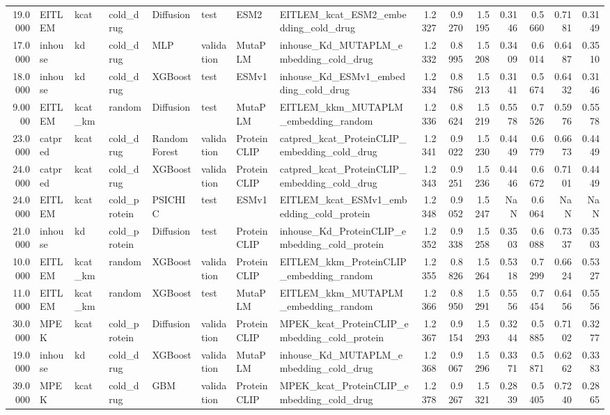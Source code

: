 \begin{tabular}{rlllllllrrrrrrr}
19.0000 & EITLEM & kcat & cold_drug & Diffusion & test & ESM2 & EITLEM_kcat_ESM2_embedding_cold_drug & 1.2327 & 0.9270 & 1.5195 & 0.3146 & 0.5660 & 0.7181 & 0.3149 \\
17.0000 & inhouse & kd & cold_drug & MLP & validation & MutaPLM & inhouse_Kd_MUTAPLM_embedding_cold_drug & 1.2332 & 0.8995 & 1.5208 & 0.3409 & 0.6014 & 0.6487 & 0.3510 \\
18.0000 & inhouse & kd & cold_drug & XGBoost & test & ESMv1 & inhouse_Kd_ESMv1_embedding_cold_drug & 1.2334 & 0.8786 & 1.5213 & 0.3141 & 0.5674 & 0.6432 & 0.3146 \\
9.0000 & EITLEM & kcat_km & random & Diffusion & test & MutaPLM & EITLEM_kkm_MUTAPLM_embedding_random & 1.2336 & 0.8624 & 1.5219 & 0.5578 & 0.7526 & 0.5976 & 0.5578 \\
23.0000 & catpred & kcat & cold_drug & Random Forest & validation & ProteinCLIP & catpred_kcat_ProteinCLIP_embedding_cold_drug & 1.2341 & 0.9022 & 1.5230 & 0.4449 & 0.6779 & 0.6673 & 0.4449 \\
24.0000 & catpred & kcat & cold_drug & XGBoost & validation & ProteinCLIP & catpred_kcat_ProteinCLIP_embedding_cold_drug & 1.2343 & 0.9251 & 1.5236 & 0.4446 & 0.6672 & 0.7101 & 0.4449 \\
24.0000 & EITLEM & kcat & cold_protein & PSICHIC & test & ESMv1 & EITLEM_kcat_ESMv1_embedding_cold_protein & 1.2348 & 0.9052 & 1.5247 & NaN & 0.6064 & NaN & NaN \\
21.0000 & inhouse & kd & cold_protein & Diffusion & test & ProteinCLIP & inhouse_Kd_ProteinCLIP_embedding_cold_protein & 1.2352 & 0.9338 & 1.5258 & 0.3503 & 0.6088 & 0.7337 & 0.3503 \\
10.0000 & EITLEM & kcat_km & random & XGBoost & validation & ProteinCLIP & EITLEM_kkm_ProteinCLIP_embedding_random & 1.2355 & 0.8826 & 1.5264 & 0.5318 & 0.7299 & 0.6624 & 0.5327 \\
11.0000 & EITLEM & kcat_km & random & XGBoost & test & MutaPLM & EITLEM_kkm_MUTAPLM_embedding_random & 1.2366 & 0.8950 & 1.5291 & 0.5556 & 0.7454 & 0.6456 & 0.5556 \\
30.0000 & MPEK & kcat & cold_protein & Diffusion & validation & ProteinCLIP & MPEK_kcat_ProteinCLIP_embedding_cold_protein & 1.2367 & 0.9154 & 1.5293 & 0.3244 & 0.5885 & 0.7102 & 0.3277 \\
19.0000 & inhouse & kd & cold_drug & XGBoost & validation & MutaPLM & inhouse_Kd_MUTAPLM_embedding_cold_drug & 1.2368 & 0.9067 & 1.5296 & 0.3371 & 0.5871 & 0.6262 & 0.3383 \\
39.0000 & MPEK & kcat & cold_drug & GBM & validation & ProteinCLIP & MPEK_kcat_ProteinCLIP_embedding_cold_drug & 1.2378 & 0.9267 & 1.5321 & 0.2839 & 0.5405 & 0.7240 & 0.2865 \\

\end{tabular}

